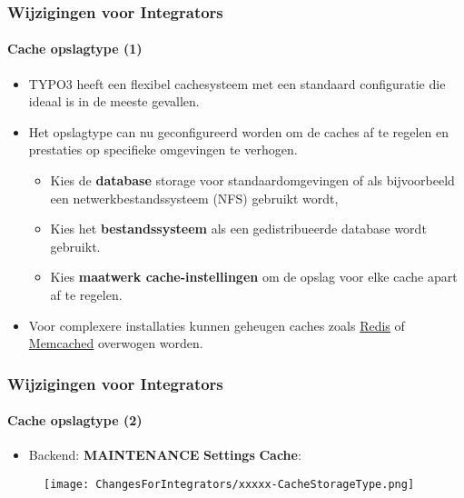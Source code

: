 \begin{frame}[fragile]
	\frametitle{Wijzigingen voor Integrators}
	\framesubtitle{Cache opslagtype (1)}

	\begin{itemize}

		\item TYPO3 heeft een flexibel cachesysteem met een standaard configuratie
			die ideaal is in de meeste gevallen.
		\item Het opslagtype can nu geconfigureerd worden om de caches af te regelen en
			prestaties op specifieke omgevingen te verhogen.

			\begin{itemize}
				\item Kies de \textbf{database} storage voor standaardomgevingen
					of als bijvoorbeeld een netwerkbestandssysteem (NFS) gebruikt wordt,
				\item Kies het \textbf{bestandssysteem} als een gedistribueerde database wordt gebruikt.
				\item Kies \textbf{maatwerk cache-instellingen} om de opslag voor elke cache apart af te regelen.
			\end{itemize}

		\item Voor complexere installaties kunnen geheugen caches zoals
			\href{https://redis.io/}{Redis}
			of
			\href{https://memcached.org/}{Memcached}
			overwogen worden.

	\end{itemize}

\end{frame}


\begin{frame}[fragile]
	\frametitle{Wijzigingen voor Integrators}
	\framesubtitle{Cache opslagtype (2)}

	\begin{itemize}

		\item Backend: \textbf{MAINTENANCE} \hspace{0.1cm}\textbf{Settings} \hspace{0.1cm}\textbf{Cache}:
		\end{itemize}

	\begin{figure}
		\texttt{[image: ChangesForIntegrators/xxxxx-CacheStorageType.png]}
	\end{figure}

\end{frame}

